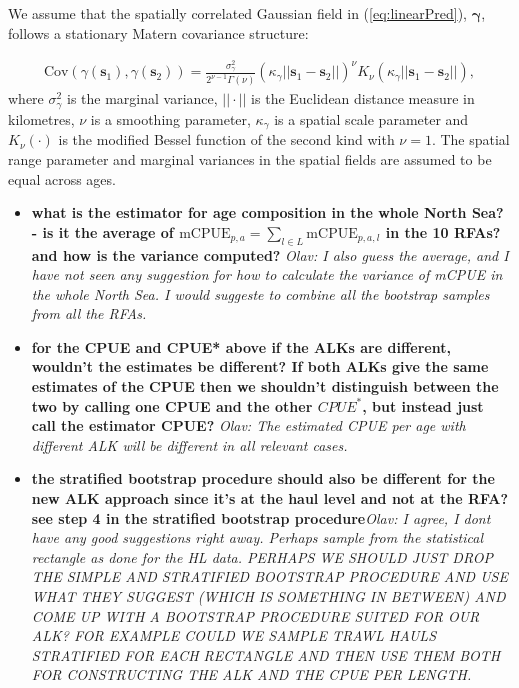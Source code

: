 \documentclass[a4paper 12pt]{article}
\numberwithin{equation}{section}
\begin{document}
We assume that the spatially correlated Gaussian field in (\ref{eq:linearPred}), $\pmb{\gamma}$, follows a stationary Matern covariance structure:

\begin{align}\label{eq:matern}
 \text{Cov}(\gamma(\mathbf{s}_1),\gamma(\mathbf{s}_2)) = \frac{\sigma^2_{\gamma}}{2^{\nu-1}\Gamma(\nu)}(\kappa_{\gamma}||\mathbf{s}_1 -\mathbf{s}_2||)^{\nu}K_{\nu}(\kappa_{\gamma}||\mathbf{s}_1-\mathbf{s}_2||),
\end{align}
where $\sigma^2_{\gamma}$ is the marginal variance, $||\cdot||$ is the Euclidean distance measure in kilometres, $\nu$ is a smoothing parameter, $\kappa_{\gamma}$ is a spatial scale parameter and $K_{\nu}(\cdot)$ is the modified Bessel function of the second kind with $\nu = 1$. The spatial range parameter and marginal variances in the spatial fields are assumed to be equal across ages.

\begin{itemize}
\item {\bf what is the estimator for age composition in the whole North Sea? - is it the average of $\mathrm{mCPUE}_{p,a} =  \sum\limits_{l \in L} \mathrm{mCPUE}_{p,a,l}$ in the 10 RFAs? and how is the variance computed?} \textit{Olav: I also guess the average, and I have not seen any suggestion for how to calculate the variance of mCPUE in the whole North Sea. I would suggeste to combine all the bootstrap samples from all the RFAs.}

\item {\bf for the CPUE and CPUE* above if the ALKs are different, wouldn't the estimates be different? If both ALKs give the same estimates of the CPUE then we shouldn't distinguish between the two by calling one CPUE and the other $CPUE^*$, but instead just call the estimator CPUE?}  \textit{Olav: The estimated CPUE per age with different ALK will be different in all relevant cases.}

\item {\bf the stratified bootstrap procedure should also be different for the new ALK approach since it's at the haul level and not at the RFA? see step 4 in the stratified bootstrap procedure}\textit{Olav: I agree, I dont have any good suggestions right away. Perhaps sample from the statistical rectangle as done for the HL data. PERHAPS WE SHOULD JUST DROP THE SIMPLE AND STRATIFIED BOOTSTRAP PROCEDURE AND USE WHAT THEY SUGGEST (WHICH IS SOMETHING IN BETWEEN) AND COME UP WITH A BOOTSTRAP PROCEDURE SUITED FOR OUR ALK? FOR EXAMPLE COULD WE SAMPLE TRAWL HAULS STRATIFIED FOR EACH RECTANGLE AND THEN USE THEM BOTH FOR CONSTRUCTING THE ALK AND THE CPUE PER LENGTH.}

\end{itemize}
\end{document}

